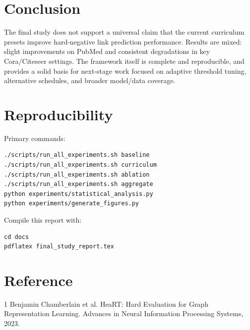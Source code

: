 \documentclass[11pt]{article}
\begin{document}
\section{Conclusion}

The final study does not support a universal claim that the current curriculum presets improve hard-negative link prediction performance. Results are mixed: slight improvements on PubMed and consistent degradations in key Cora/Citeseer settings. The framework itself is complete and reproducible, and provides a solid basis for next-stage work focused on adaptive threshold tuning, alternative schedules, and broader model/data coverage.

\section*{Reproducibility}

Primary commands:
\begin{verbatim}
./scripts/run_all_experiments.sh baseline
./scripts/run_all_experiments.sh curriculum
./scripts/run_all_experiments.sh ablation
./scripts/run_all_experiments.sh aggregate
python experiments/statistical_analysis.py
python experiments/generate_figures.py
\end{verbatim}

Compile this report with:
\begin{verbatim}
cd docs
pdflatex final_study_report.tex
\end{verbatim}

\section*{Reference}

\begin{thebibliography}{1}
Benjamin Chamberlain et al.
\newblock HeaRT: Hard Evaluation for Graph Representation Learning.
\newblock Advances in Neural Information Processing Systems, 2023.
\end{thebibliography}
\end{document}
